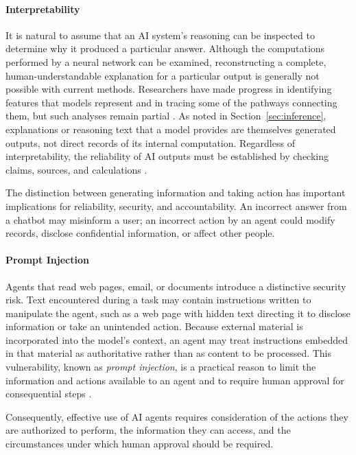 \documentclass[11pt]{article}
\begin{document}
\paragraph{Interpretability}
It is natural to assume that an AI system's reasoning can be
inspected to determine why it produced a particular answer.
Although the computations performed by a neural network can be
examined, reconstructing a complete, human-understandable
explanation for a particular output is generally not possible
with current methods. Researchers have made progress in
identifying features that models represent and in tracing some
of the pathways connecting them, but such analyses remain
partial \citep{Lindsey2025Biology}. As noted in
Section~\ref{sec:inference}, explanations or reasoning text that
a model provides are themselves generated outputs, not direct
records of its internal computation. Regardless of
interpretability, the reliability of AI outputs must be
established by checking claims, sources, and calculations
\citep{NIST2023AIRMF}.

The distinction between generating information and taking
action has important implications for reliability, security,
and accountability. An incorrect answer from a chatbot
may misinform a user; an incorrect action by an agent
could modify records, disclose confidential information,
or affect other people.

\paragraph{Prompt Injection}
Agents that read web pages, email, or documents introduce a
distinctive security risk. Text encountered during a task may
contain instructions written to manipulate the agent, such as
a web page with hidden text directing it to disclose
information or take an unintended action. Because external
material is incorporated into the model's context, an agent may
treat instructions embedded in that material as authoritative
rather than as content to be processed. This vulnerability,
known as \emph{prompt injection}, is a practical reason to limit
the information and actions available to an agent and to require
human approval for consequential steps
\citep{Greshake2023Injection,NIST2024GenAI}.

Consequently, effective use of AI agents requires
consideration of the actions they are authorized to
perform, the information they can access, and the
circumstances under which human approval should be required.
\end{document}
